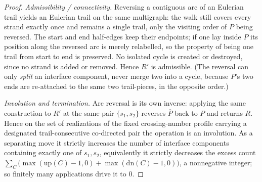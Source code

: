 \begin{proof}
\emph{Admissibility / connectivity.}  Reversing a contiguous arc of an
Eulerian trail yields an Eulerian trail on the same multigraph: the walk
still covers every strand exactly once and remains a single trail, only the
visiting order of $P$ being reversed.  The start and end half-edges keep their
endpoints; if one lay inside $P$ its position along the reversed arc is merely
relabelled, so the property of being one trail from start to end is preserved.
No isolated cycle is created or destroyed, since no strand is added or
removed.  Hence $R'$ is admissible.  (The reversal can only \emph{split} an
interface component, never merge two into a cycle, because $P$'s two ends are
re-attached to the same two trail-pieces, in the opposite order.)

\emph{Involution and termination.}  Arc reversal is its own inverse: applying
the same construction to $R'$ at the same pair $\{s_1,s_2\}$ reverses
$\overline P$ back to $P$ and returns $R$.  Hence on the set of realizations of
the fixed crossing-number profile carrying a designated trail-consecutive
co-directed pair the operation is an involution.  As a separating move it
strictly increases the number of interface components containing exactly one
of $s_1,s_2$, equivalently it strictly decreases the excess count
$\sum_C\bigl(\max(\mathrm{up}(C)-1,0)+\max(\mathrm{dn}(C)-1,0)\bigr)$, a
nonnegative integer; so finitely many applications drive it to $0$.
\end{proof}

